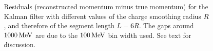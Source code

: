 \begin{figure}
\centering


\caption[Momentum residuals for various Kalman filter parameters]{\label{fig:kalman-residuals}Residuals (reconstructed momentum minus true momentum) for the Kalman filter with different values of the charge smoothing radius $R$, and therefore of the segment length $L=6R$. The gaps around $1000\,\mathrm{MeV}$ are due to the $100\,\mathrm{MeV}$ bin width used. See text for discussion.}
\end{figure}


